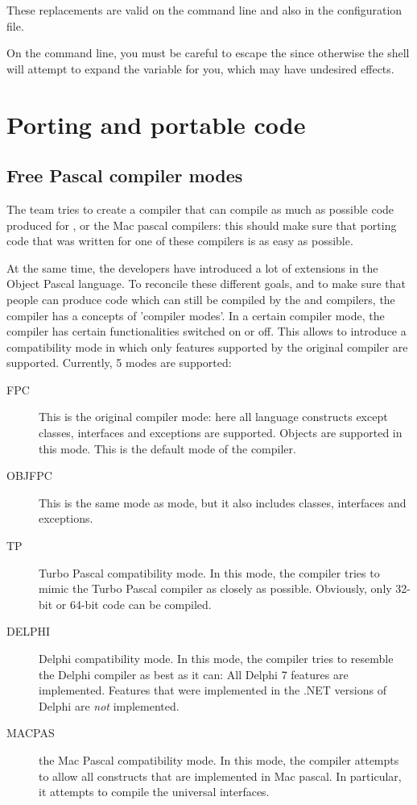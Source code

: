 These replacements are valid on the command line and also in the
configuration file.

On the \linux{} command line, you must be careful to escape the \var{\$} since
otherwise the shell will attempt to expand the variable for you, which may have
undesired effects.





\chapter{Porting and portable code}

\section{Free Pascal compiler modes}
The \fpc team tries to create a compiler that can compile as much as
possible code produced for \tp, \delphi{} or the Mac pascal compilers: this
should make sure that porting code that was written for one of these
compilers is as easy as possible.

At the same time, the \fpc developers have introduced a lot of extensions
in the Object Pascal language. To reconcile these different goals, and to
make sure that people can produce code which can still be compiled by
the \tp and \delphi compilers, the compiler has a concepts of 'compiler
modes'. In a certain compiler mode, the compiler has certain functionalities
switched on or off. This allows to introduce a compatibility mode in which
only features supported by the original compiler are supported. Currently,
5 modes are supported:
\begin{description}
\item[FPC] This is the original \fpc compiler mode: here all language
constructs except classes, interfaces and exceptions are supported. 
Objects are supported in this mode. This is the default mode of the
compiler.
\item[OBJFPC] This is the same mode as  mode, but it also includes
classes, interfaces and exceptions.
\item[TP] Turbo Pascal compatibility mode. In this mode, the compiler tries
to mimic the Turbo Pascal compiler as closely as possible. Obviously, only
32-bit or 64-bit code can be compiled.
\item[DELPHI] Delphi compatibility mode. In this mode, the compiler tries
to resemble the Delphi compiler as best as it can: All Delphi 7 features are
implemented. Features that were implemented in the .NET versions of Delphi
are {\em not} implemented.
\item[MACPAS] the Mac Pascal compatibility mode. In this mode, the compiler
attempts to allow all constructs that are implemented in Mac pascal. In
particular, it attempts to compile the universal interfaces.
\end{description}


